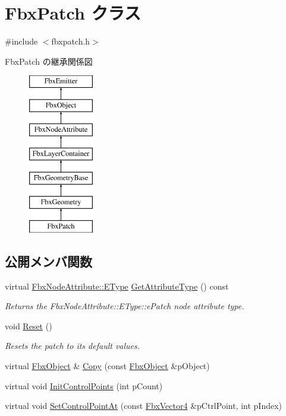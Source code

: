 \hypertarget{class_fbx_patch}{}\section{Fbx\+Patch クラス}
\label{class_fbx_patch}


{\ttfamily \#include $<$fbxpatch.\+h$>$}

Fbx\+Patch の継承関係図\begin{figure}[H]
\begin{center}
\leavevmode
\includegraphics[height=7.000000cm]{class_fbx_patch}
\end{center}
\end{figure}
\subsection*{公開メンバ関数}
\begin{DoxyCompactItemize}
\item 
virtual \hyperlink{class_fbx_node_attribute_a08e1669d3d1a696910756ab17de56d6a}{Fbx\+Node\+Attribute\+::\+E\+Type} \hyperlink{class_fbx_patch_a4eb7de708949e012e0dcae2cb87a2ef4}{Get\+Attribute\+Type} () const
\begin{DoxyCompactList}\small\item\em Returns the Fbx\+Node\+Attribute\+::\+E\+Type\+::e\+Patch node attribute type. \end{DoxyCompactList}\item 
void \hyperlink{class_fbx_patch_a8a1fb844916976ff4e0396e140e30bcf}{Reset} ()
\begin{DoxyCompactList}\small\item\em Resets the patch to its default values. \end{DoxyCompactList}\item 
virtual \hyperlink{class_fbx_object}{Fbx\+Object} \& \hyperlink{class_fbx_patch_a424542a42ec75d3c5236cc366adecd89}{Copy} (const \hyperlink{class_fbx_object}{Fbx\+Object} \&p\+Object)
\item 
virtual void \hyperlink{class_fbx_patch_a0f82daebd6307d417561b1d0a188f95d}{Init\+Control\+Points} (int p\+Count)
\item 
virtual void \hyperlink{class_fbx_patch_a43bd49dba561cff8f166b8f7a12816f6}{Set\+Control\+Point\+At} (const \hyperlink{class_fbx_vector4}{Fbx\+Vector4} \&p\+Ctrl\+Point, int p\+Index)
\end{DoxyCompactItemize}

